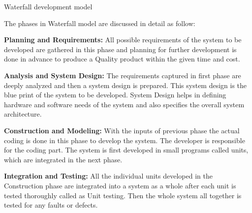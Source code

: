 \documentclass{beamer}
\begin{document}
\begin{frame}{\centerline{Waterfall development model}}
The phases in Waterfall model are discussed in detail as follow:
\newline

\textbf{Planning and Requirements:} All possible requirements of the system to be developed are gathered in this phase and planning for further development is done in advance to produce a Quality product within the given time and cost.
\newline

\textbf{Analysis and System Design:} The requirements captured in first phase are deeply analyzed and then a system design is prepared. This system design is the blue print of the system to be developed. System Design helps in defining hardware and software needs of the system and also specifies the overall system architecture.
\newline

\end{frame}

\begin{frame}

\textbf{Construction and Modeling:} With the inputs of previous phase the actual coding is done in this phase to develop the system. The developer is responsible for the coding part. The system is first developed in small programs called units, which are integrated in the next phase.
\newline

\textbf{Integration and Testing:} All the individual units developed in the Construction phase are integrated into a system as a whole after each unit is tested thoroughly called as Unit testing. Then the whole system all together is tested for any faults or defects.
\newline

\end{frame}
\end{document}
